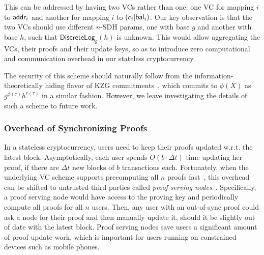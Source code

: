 This can be addressed by having two VCs rather than one: one VC for mapping $i$ to $\mathsf{addr}_i$ and another for mapping $i$ to $(c_i\vert\mathsf{bal}_i)$.
Our key observation is that the two VCs should use different $n$-SDH params, one with base $g$ and another with base $h$, such that $\mathsf{DiscreteLog}_g(h)$ is unknown.
This would allow aggregating the VCs, their proofs and their update keys, so as to introduce zero computational and communication overhead in our stateless cryptocurrency.

The security of this scheme should naturally follow from the information-theoretically hiding flavor of KZG commitments~\cite{KZG10a}, which commits to $\phi(X)$ as $g^{\phi(\tau)}h^{r(\tau)}$ in a similar fashion.
However, we leave investigating the details of such a scheme to future work.

\subsubsection{Overhead of Synchronizing Proofs}
\label{s:stateless-cryptocurrency:proof-serving-nodes}
In a stateless cryptocurrency, users need to keep their proofs updated w.r.t. the latest block.
Asymptotically, each user spends $O(b\cdot \Delta{t})$ time updating her proof, if there are $\Delta{t}$ new blocks of $b$ transactions each.
Fortunately, when the underlying VC scheme supports precomputing all $n$ proofs fast~\cite{CPZ18,TCZ+20}, this overhead can be shifted to untrusted third parties called \textit{proof serving nodes}~\cite{CPZ18}.
Specifically, a proof serving node would have access to the proving key \prk and periodically compute all proofs for all $n$ users.
Then, any user with an out-of-sync proof could ask a node for their proof and then manually update it, should it be slightly out of date with the latest block.
Proof serving nodes save users a significant amount of proof update work, which is important for users running on constrained devices such as mobile phones.
